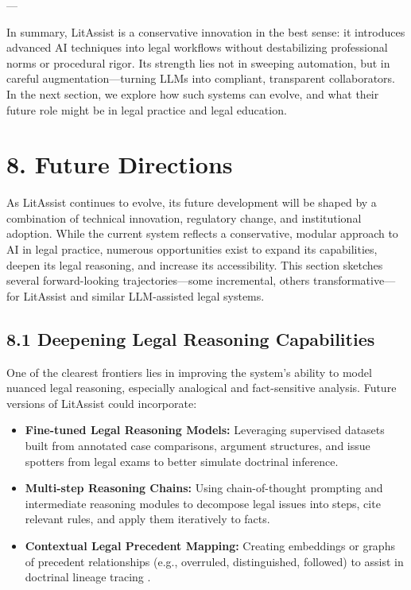 \documentclass[12pt,a4paper]{article}
\begin{document}
---

In summary, LitAssist is a conservative innovation in the best sense: it introduces advanced AI techniques into legal workflows without destabilizing professional norms or procedural rigor. Its strength lies not in sweeping automation, but in careful augmentation—turning LLMs into compliant, transparent collaborators. In the next section, we explore how such systems can evolve, and what their future role might be in legal practice and legal education.

\section*{8. Future Directions}

As LitAssist continues to evolve, its future development will be shaped by a combination of technical innovation, regulatory change, and institutional adoption. While the current system reflects a conservative, modular approach to AI in legal practice, numerous opportunities exist to expand its capabilities, deepen its legal reasoning, and increase its accessibility. This section sketches several forward-looking trajectories—some incremental, others transformative—for LitAssist and similar LLM-assisted legal systems.

\subsection*{8.1 Deepening Legal Reasoning Capabilities}

One of the clearest frontiers lies in improving the system's ability to model nuanced legal reasoning, especially analogical and fact-sensitive analysis. Future versions of LitAssist could incorporate:

\begin{itemize}
\item \textbf{Fine-tuned Legal Reasoning Models:} Leveraging supervised datasets built from annotated case comparisons, argument structures, and issue spotters from legal exams to better simulate doctrinal inference.

\item \textbf{Multi-step Reasoning Chains:} Using chain-of-thought prompting and intermediate reasoning modules to decompose legal issues into steps, cite relevant rules, and apply them iteratively to facts.

\item \textbf{Contextual Legal Precedent Mapping:} Creating embeddings or graphs of precedent relationships (e.g., overruled, distinguished, followed) to assist in doctrinal lineage tracing \cite{Katz2017}.
\end{itemize}
\end{document}
